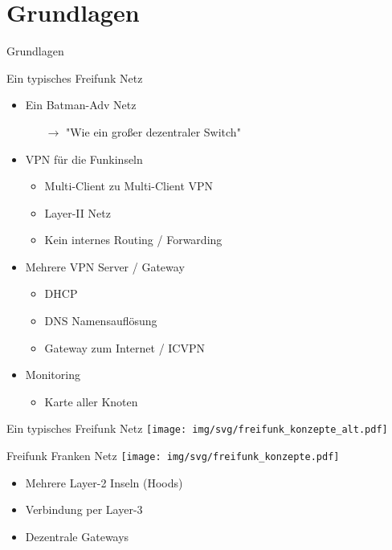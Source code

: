 \section{Grundlagen}
\begin{frame}{}
    \begin{center}
        Grundlagen
     \end{center}
\end{frame}

\begin{frame}{Ein typisches Freifunk Netz}
    \begin{itemize}
        \item Ein Batman-Adv Netz
        \begin{itemize}
            \item[$\rightarrow$] "Wie ein großer dezentraler Switch"
        \end{itemize}
        \item VPN für die Funkinseln
        \begin{itemize}
            \item Multi-Client zu Multi-Client VPN
            \item Layer-II Netz
            \item Kein internes Routing / Forwarding
        \end{itemize}
        \item Mehrere VPN Server / Gateway
        \begin{itemize}
            \item DHCP
            \item DNS Namensauflösung
            \item Gateway zum Internet / ICVPN
        \end{itemize}
        \item Monitoring
        \begin{itemize}
            \item Karte aller Knoten
        \end{itemize}
    \end{itemize}
\end{frame}

\begin{frame}{Ein typisches Freifunk Netz}
    \texttt{[image: img/svg/freifunk\_konzepte\_alt.pdf]}
\end{frame}

\begin{frame}{Freifunk Franken Netz}
    \texttt{[image: img/svg/freifunk\_konzepte.pdf]}

    \begin{itemize}
        \item Mehrere Layer-2 Inseln (Hoods)
        \item Verbindung per Layer-3
        \item Dezentrale Gateways
    \end{itemize}
\end{frame}
